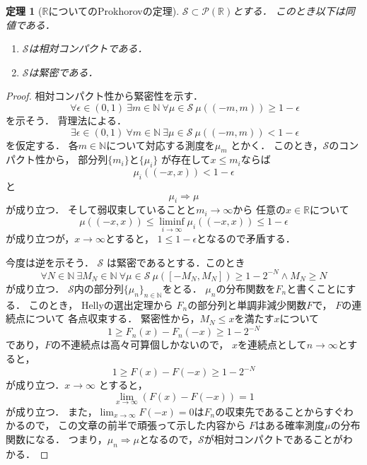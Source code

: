 \documentclass[leqno, a4paper, 12pt]{jsarticle}
\newtheorem{thm}{定理}
\newcommand{\To}{\Longrightarrow}
\newcommand{\nn}{\mathbb{N}}
\newcommand{\rr}{\mathbb{R}}
\begin{document}
\begin{thm}[$\rr$についてのProkhorovの定理]
$\mathcal{S}\subset \mathcal{P}(\rr)$とする．
このとき以下は同値である．
\begin{enumerate}
\item $\mathcal{S}$は相対コンパクトである．
\item $\mathcal{S}$は緊密である．
\end{enumerate}
\end{thm}
\begin{proof}
相対コンパクト性から緊密性を示す．
\[
	\ \forall \epsilon\in (0, 1)
	\ \exists m\in \nn
	\ \forall \mu\in \mathcal{S}\ 
	\mu((-m, m))\ge 1-\epsilon
\]
を示そう．
背理法による．
\[
	\ \exists \epsilon\in (0, 1)
	\ \forall m\in \nn
	\ \exists \mu\in \mathcal{S}\ 
	\mu((-m, m))< 1-\epsilon
\]
を仮定する．
各$m\in \nn$について対応する測度を$\mu_m$
とかく．
このとき，$\mathcal{S}$のコンパクト性から，
部分列$\{m_i\}$と$\{\mu_i\}$
が存在して$x\le m_i$ならば
\[
\mu_i((-x, x))<1-\epsilon
\]
と
\[
\mu_i\To \mu
\]
が成り立つ．
そして弱収束していることと$m_i\to \infty$から
任意の$x\in \rr$について
\[
\mu((-x, x))\le \liminf_{i\to \infty}\mu_i((-x, x))\le 1-\epsilon
\]
が成り立つが，$x\to \infty$とすると，
$1\le 1-\epsilon$となるので矛盾する．

今度は逆を示そう．
$\mathcal{S}$
は緊密であるとする．このとき
\[
	\forall N\in \nn\ \exists M_N\in \nn\ \forall \mu\in \mathcal{S}\ 
	\mu([-M_N, M_N])\ge 1-2^{-N}\land M_N\ge N
\]
が成り立つ．
$\mathcal{S}$内の部分列$\{\mu_n\}_{n\in \nn}$をとる．
$\mu_n$の分布関数を$F_n$と書くことにする．
このとき，
Hellyの選出定理から
$F_n$の部分列と単調非減少関数$F$で，
$F$の連続点について
各点収束する．
緊密性から，$M_N\le x$を満たす$x$について
\[
1\ge F_n(x)-F_n(-x)\ge 1-2^{-N}
\]
であり，$F$の不連続点は高々可算個しかないので，
$x$を連続点として$n\to \infty$とすると，
\[
1\ge F(x)-F(-x)\ge 1-2^{-N}
\]
が成り立つ．$x\to \infty$
とすると，
\[
\lim_{x\to \infty}(F(x)-F(-x))=1
\]
が成り立つ．
また，$\lim_{x\to \infty}F(-x)=0$は$F_n$の収束先であることからすぐわかるので，
この文章の前半で頑張って示した内容から
$F$はある確率測度$\mu$の分布関数になる．
つまり，$\mu_n\To \mu$となるので，$\mathcal{S}$が相対コンパクトであることがわかる．
\end{proof}
\end{document}
